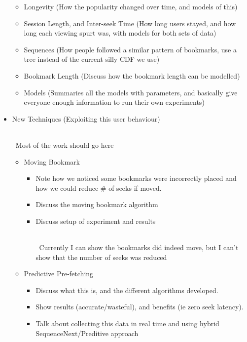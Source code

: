 \documentclass[a4paper]{article}
\newcommand{\note}[1]{
    {~\\~\color{red}\sf #1 }
}
\begin{document}
\begin{itemize}
\begin{itemize}
            \item Longevity (How the popularity changed over time, and models of this)

            \item Session Length, and Inter-seek Time (How long users stayed, and how long each viewing spurt was, with models for both sets of data)

            \item Sequences (How people followed a similar pattern of bookmarks, use a tree instead of the current silly CDF we use)

\cbend
\cbstart[7pt]
            \item Bookmark Length (Discuss how the bookmark length can be modelled)
\cbend
\cbstart
            \item Models (Summaries all the models with parameters, and basically give everyone enough information to run their own experiments)
\cbend
        \end{itemize}

\cbstart[7pt]
    \item New Techniques (Exploiting this user behaviour)
        \note{Most of the work should go here}

        \begin{itemize}

            \item Moving Bookmark
                \begin{itemize}
                    \item Note how we noticed some bookmarks were incorrectly placed and how we could reduce \# of seeks if moved.
                    \item Discuss the moving bookmark algorithm
                    \item Discuss setup of experiment and results
                    \note{Currently I can show the bookmarks did indeed move, but I can't show that the number of seeks was reduced}
                \end{itemize}

            \item Predictive Pre-fetching
                \begin{itemize}
                    \item Discuss what this is, and the different algorithms developed.
                    \item Show results (accurate/wasteful), and benefits (ie zero seek latency).
                    \item Talk about collecting this data in real time and using hybrid SequenceNext/Preditive approach


\end{itemize}
\end{itemize}
\end{itemize}
\end{document}
